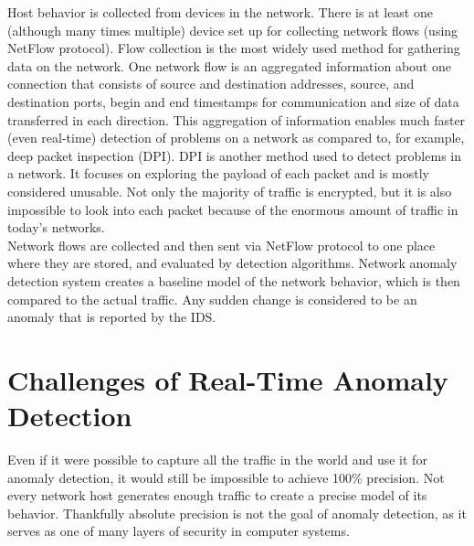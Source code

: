 \documentclass[thesis=B,english]{FITthesis}[2012/10/20]
\begin{document}
Host behavior is collected from devices in the network.                           
There is at least one (although many times multiple) device set up for collecting network flows (using NetFlow protocol).
Flow collection is the most widely used method for gathering data on the network.
One network flow is an aggregated information about one connection that consists of source and destination addresses, source, and destination ports, begin and end timestamps for communication and size of data transferred in each direction.
This aggregation of information enables much faster (even real-time) detection of problems on a network as compared to, for example, deep packet inspection (DPI).
DPI is another method used to detect problems in a network.                       
It focuses on exploring the payload of each packet and is mostly considered unusable.
Not only the majority of traffic is encrypted, but it is also impossible to look into each packet because of the enormous amount of traffic in today's networks. \\
                                                                                  
Network flows are collected and then sent via NetFlow protocol to one place where they are stored, and evaluated by detection algorithms.
Network anomaly detection system creates a baseline model of the network behavior, which is then compared to the actual traffic.
Any sudden change is considered to be an anomaly that is reported by the IDS. \\  
                                                                                  
\section{Challenges of Real-Time Anomaly Detection}\label{sec:challenges}                              
Even if it were possible to capture all the traffic in the world and use it for anomaly detection, it would still be impossible to achieve 100\% precision.
Not every network host generates enough traffic to create a precise model of its behavior.
Thankfully absolute precision is not the goal of anomaly detection, as it serves as one of many layers of security in computer systems. \\
                                                                                  
\end{document}
